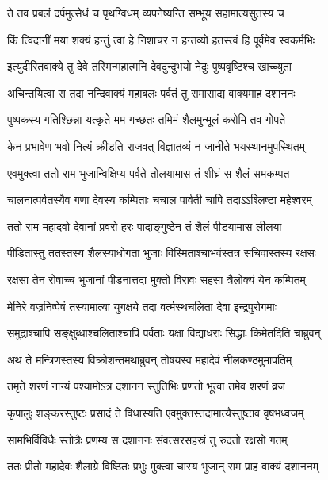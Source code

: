 \twolineshloka
{ते तव प्रबलं दर्पमुत्सेधं च पृथग्विधम्}
{व्यपनेष्यन्ति सम्भूय सहामात्यसुतस्य च} %

\twolineshloka
{किं त्विदानीं मया शक्यं हन्तुं त्वां हे निशाचर}
{न हन्तव्यो हतस्त्वं हि पूर्वमेव स्वकर्मभिः} %

\twolineshloka
{इत्युदीरितवाक्ये तु देवे तस्मिन्महात्मनि}
{देवदुन्दुभयो नेदुः पुष्पवृष्टिश्च खाच्च्युता} %

\twolineshloka
{अचिन्तयित्वा स तदा नन्दिवाक्यं महाबलः}
{पर्वतं तु समासाद्य वाक्यमाह दशाननः} %

\twolineshloka
{पुष्पकस्य गतिश्छिन्ना यत्कृते मम गच्छतः}
{तमिमं शैलमुन्मूलं करोमि तव गोपते} %

\twolineshloka
{केन प्रभावेण भवो नित्यं क्रीडति राजवत्}
{विज्ञातव्यं न जानीते भयस्थानमुपस्थितम्} %

\twolineshloka
{एवमुक्त्वा ततो राम भुजान्विक्षिप्य पर्वते}
{तोलयामास तं शीघ्रं स शैलं समकम्पत} %

\twolineshloka
{चालनात्पर्वतस्यैव गणा देवस्य कम्पिताः}
{चचाल पार्वती चापि तदाऽऽश्लिष्टा महेश्वरम्} %

\twolineshloka
{ततो राम महादवो देवानां प्रवरो हरः}
{पादाङ्गुष्ठेन तं शैलं पीडयामास लीलया} %

\twolineshloka
{पीडितास्तु ततस्तस्य शैलस्याधोगता भुजाः}
{विस्मिताश्चाभवंस्तत्र सचिवास्तस्य रक्षसः} %

\twolineshloka
{रक्षसा तेन रोषाच्च भुजानां पीडनात्तदा}
{मुक्तो विरावः सहसा त्रैलोक्यं येन कम्पितम्} %

\twolineshloka
{मेनिरे वज्रनिष्पेषं तस्यामात्या युगक्षये}
{तदा वर्त्मस्थचलिता देवा इन्द्रपुरोगमाः} %

\twolineshloka
{समुद्राश्चापि सङ्क्षुब्धाश्चलिताश्चापि पर्वताः}
{यक्षा विद्याधराः सिद्धाः किमेतदिति चाब्रुवन्} %

\twolineshloka
{अथ ते मन्त्रिणस्तस्य विक्रोशन्तमथाब्रुवन्}
{तोषयस्व महादेवं नीलकण्ठमुमापतिम्} %

\twolineshloka
{तमृते शरणं नान्यं पश्यामोऽत्र दशानन}
{स्तुतिभिः प्रणतो भूत्वा तमेव शरणं व्रज} %

\twolineshloka
{कृपालुः शङ्करस्तुष्टः प्रसादं ते विधास्यति}
{एवमुक्तस्तदामात्यैस्तुष्टाव वृषभध्वजम्} %

\twolineshloka
{सामभिर्विविधैः स्तोत्रैः प्रणम्य स दशाननः}
{संवत्सरसहस्रं तु रुदतो रक्षसो गतम्} %

\twolineshloka
{ततः प्रीतो महादेवः शैलाग्रे विष्ठितः प्रभुः}
{मुक्त्वा चास्य भुजान् राम प्राह वाक्यं दशाननम्} %

